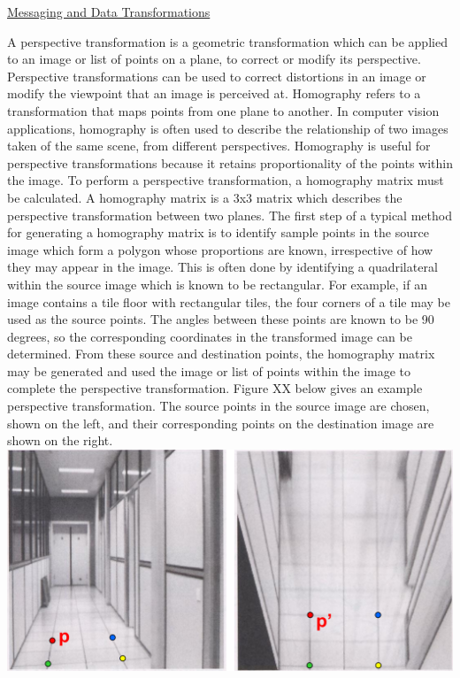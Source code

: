 \documentclass[titlepage,draft]{article}
\begin{document}
\underline{Messaging and Data Transformations}

A perspective transformation is a geometric transformation which can be applied to an image or list of points on a plane, to correct or modify its perspective. Perspective transformations can be used to correct distortions in an image or modify the viewpoint that an image is perceived at.
Homography refers to a transformation that maps points from one plane to another. In computer vision applications, homography is often used to describe the relationship of two images taken of the same scene, from different perspectives. Homography is useful for perspective transformations because it retains proportionality of the points within the image. To perform a perspective transformation, a homography matrix must be calculated. A homography matrix is a 3x3 matrix which describes the perspective transformation between two planes.
The first step of a typical method for generating a homography matrix is to identify sample points in the source image which form a polygon whose proportions are known, irrespective of how they may appear in the image. This is often done by identifying a quadrilateral within the source image which is known to be rectangular. For example, if an image contains a tile floor with rectangular tiles, the four corners of a tile may be used as the source points. The angles between these points are known to be 90 degrees, so the corresponding coordinates in the transformed image can be determined. From these source and destination points, the homography matrix may be generated and used the image or list of points within the image to complete the perspective transformation. Figure XX below gives an example perspective transformation. The source points in the source image are chosen, shown on the left, and their corresponding points on the destination image are shown on the right.
\includegraphics{transform_carleton.png}
\end{document}
